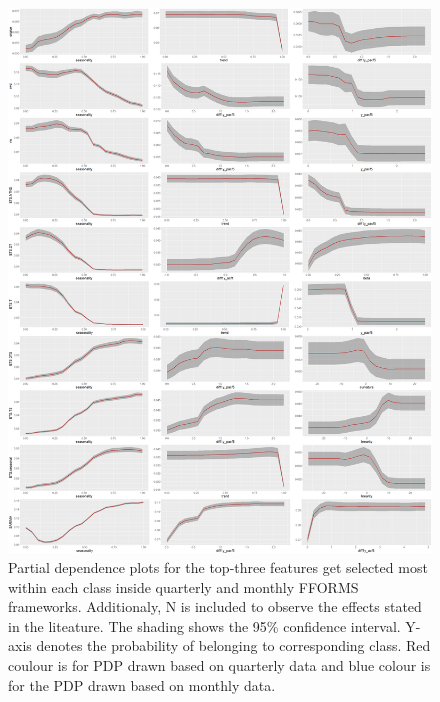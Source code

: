\documentclass[11pt,a4paper,]{article}
\begin{document}
\begin{figure}
\centering
\includegraphics{figures/pdpquarterly1-1.png}
\caption{\label{fig:pdpquarterly1}Partial dependence plots for the top-three
features get selected most within each class inside quarterly and
monthly FFORMS frameworks. Additionaly, N is included to observe the
effects stated in the liteature. The shading shows the 95\% confidence
interval. Y-axis denotes the probability of belonging to corresponding
class. Red coulour is for PDP drawn based on quarterly data and blue
colour is for the PDP drawn based on monthly data.}
\end{figure}

\newpage
\end{document}
